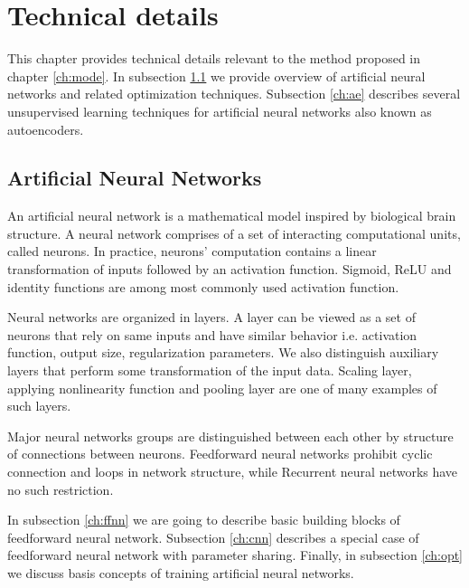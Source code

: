 
\chapter{Technical details}
\label{ch:tede}

This chapter provides technical details relevant to the method proposed in chapter \ref{ch:mode}.
In subsection \ref{ch:nn} we provide overview of artificial neural networks and related optimization techniques.
Subsection \ref{ch:ae} describes several unsupervised learning techniques for artificial neural networks also known as autoencoders.

\section{Artificial Neural Networks}
\label{ch:nn}
An artificial neural network is a mathematical model inspired by biological brain structure.
A neural network comprises of a set of interacting computational units, called neurons.
In practice, neurons' computation contains a linear transformation of inputs followed by an activation function.
Sigmoid, ReLU and identity functions are among most commonly used activation function.

Neural networks are organized in layers.
A layer can be viewed as a set of neurons that rely on same inputs and have similar behavior i.e. activation function, output size, regularization parameters.
We also distinguish auxiliary layers that perform some transformation of the input data.
Scaling layer, applying nonlinearity function and pooling layer are one of many examples of such layers.

Major neural networks groups are distinguished between each other by structure of connections between neurons.
Feedforward neural networks prohibit cyclic connection and loops in network structure, while Recurrent neural networks have no such restriction.

In subsection \ref{ch:ffnn} we are going to describe basic building blocks of feedforward neural network.
Subsection \ref{ch:cnn} describes a special case of feedforward neural network with parameter sharing.
Finally, in subsection \ref{ch:opt} we discuss basis concepts of training artificial neural networks.

